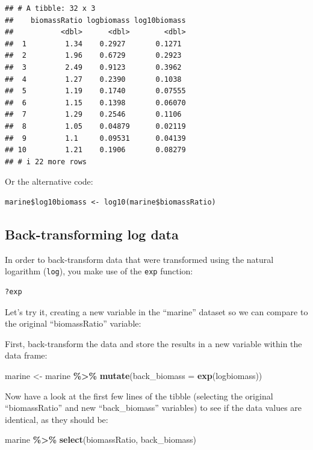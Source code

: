 \documentclass[
]{book}
\newenvironment{Shaded}{\begin{snugshade}}{\end{snugshade}}
\newcommand{\AttributeTok}[1]{\textcolor[rgb]{0.13,0.29,0.53}{#1}}
\newcommand{\FunctionTok}[1]{\textcolor[rgb]{0.13,0.29,0.53}{\textbf{#1}}}
\newcommand{\NormalTok}[1]{#1}
\newcommand{\OtherTok}[1]{\textcolor[rgb]{0.56,0.35,0.01}{#1}}
\newcommand{\SpecialCharTok}[1]{\textcolor[rgb]{0.81,0.36,0.00}{\textbf{#1}}}
\begin{document}
\begin{verbatim}
## # A tibble: 32 x 3
##    biomassRatio logbiomass log10biomass
##           <dbl>      <dbl>        <dbl>
##  1         1.34    0.2927       0.1271 
##  2         1.96    0.6729       0.2923 
##  3         2.49    0.9123       0.3962 
##  4         1.27    0.2390       0.1038 
##  5         1.19    0.1740       0.07555
##  6         1.15    0.1398       0.06070
##  7         1.29    0.2546       0.1106 
##  8         1.05    0.04879      0.02119
##  9         1.1     0.09531      0.04139
## 10         1.21    0.1906       0.08279
## # i 22 more rows
\end{verbatim}

Or the alternative code:

\begin{verbatim}
marine$log10biomass <- log10(marine$biomassRatio)
\end{verbatim}

\subsection{Back-transforming log data}\label{back_transform}

In order to back-transform data that were transformed using the natural logarithm (\texttt{log}), you make use of the \texttt{exp} function:

\begin{verbatim}
?exp
\end{verbatim}

Let's try it, creating a new variable in the ``marine'' dataset so we can compare to the original ``biomassRatio'' variable:

First, back-transform the data and store the results in a new variable within the data frame:

\begin{Shaded}
\begin{Highlighting}[]
\NormalTok{marine }\OtherTok{\textless{}{-}}\NormalTok{ marine }\SpecialCharTok{\%\textgreater{}\%}
  \FunctionTok{mutate}\NormalTok{(}\AttributeTok{back\_biomass =} \FunctionTok{exp}\NormalTok{(logbiomass))}
\end{Highlighting}
\end{Shaded}

Now have a look at the first few lines of the tibble (selecting the original ``biomassRatio'' and new ``back\_biomass'' variables) to see if the data values are identical, as they should be:

\begin{Shaded}
\begin{Highlighting}[]
\NormalTok{marine }\SpecialCharTok{\%\textgreater{}\%}
  \FunctionTok{select}\NormalTok{(biomassRatio, back\_biomass)}
\end{Highlighting}
\end{Shaded}
\end{document}

